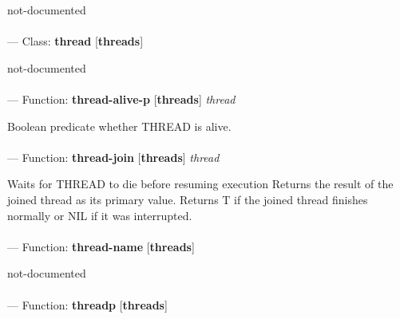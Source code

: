 \begin{adjustwidth}{5em}{5em}
not-documented
\end{adjustwidth}

\paragraph{}
\label{THREADS:THREAD}
--- Class: \textbf{thread} [\textbf{threads}] \textit{}

\begin{adjustwidth}{5em}{5em}
not-documented
\end{adjustwidth}

\paragraph{}
\label{THREADS:THREAD-ALIVE-P}
--- Function: \textbf{thread-alive-p} [\textbf{threads}] \textit{thread}

\begin{adjustwidth}{5em}{5em}
Boolean predicate whether THREAD is alive.
\end{adjustwidth}

\paragraph{}
\label{THREADS:THREAD-JOIN}
--- Function: \textbf{thread-join} [\textbf{threads}] \textit{thread}

\begin{adjustwidth}{5em}{5em}
Waits for THREAD to die before resuming execution
Returns the result of the joined thread as its primary value.
Returns T if the joined thread finishes normally or NIL if it was interrupted.
\end{adjustwidth}

\paragraph{}
\label{THREADS:THREAD-NAME}
--- Function: \textbf{thread-name} [\textbf{threads}] \textit{}

\begin{adjustwidth}{5em}{5em}
not-documented
\end{adjustwidth}

\paragraph{}
\label{THREADS:THREADP}
--- Function: \textbf{threadp} [\textbf{threads}] \textit{}

